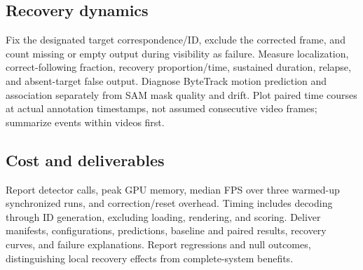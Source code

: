 \documentclass{article}
\begin{document}
\subsection{Recovery dynamics}

Fix the designated target correspondence/ID, exclude the corrected frame, and count missing or empty output during visibility as failure. Measure localization, correct-following fraction, recovery proportion/time, sustained duration, relapse, and absent-target false output. Diagnose ByteTrack motion prediction and association separately from SAM mask quality and drift. Plot paired time courses at actual annotation timestamps, not assumed consecutive video frames; summarize events within videos first.

\subsection{Cost and deliverables}

Report detector calls, peak GPU memory, median FPS over three warmed-up synchronized runs, and correction/reset overhead. Timing includes decoding through ID generation, excluding loading, rendering, and scoring. Deliver manifests, configurations, predictions, baseline and paired results, recovery curves, and failure explanations. Report regressions and null outcomes, distinguishing local recovery effects from complete-system benefits.

\clearpage




\end{document}
